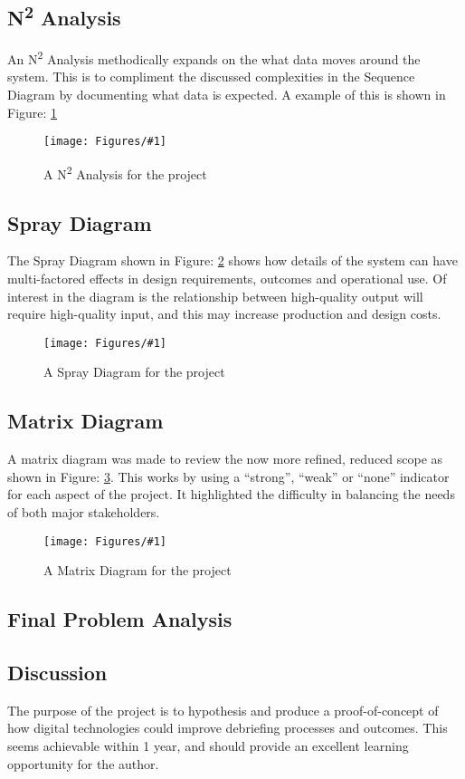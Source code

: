 \documentclass{UoNMCHA}
\newcommand{\fref}[1] {Figure: \ref{#1}}
\newcommand{\fFigure}[3]{
	\begin{figure}[h]
        \begin{center}  
            \texttt{[image: Figures/\#1]}  
            \caption{#2}
            \label{#1}
        \end{center}
	\end{figure}
}
\numberwithin{equation}{section}
\begin{document}
\subsection{N\textsuperscript{2} Analysis}
An N\textsuperscript{2} Analysis methodically expands on the what data moves around the system. This is to compliment the discussed complexities in the Sequence Diagram by documenting what data is expected. A example of this is shown in \fref{n2analysis.png}
\fFigure{n2analysis.png}{A N\textsuperscript{2} Analysis for the project}{0.8}

\subsection{Spray Diagram}
The Spray Diagram shown in \fref{SprayDiagram.png} shows how details of the system can have multi-factored effects in design requirements, outcomes and operational use. Of interest in the diagram is the relationship between high-quality output will require high-quality input, and this may increase production and design costs. 
\fFigure{SprayDiagram.png}{A Spray Diagram for the project}{0.8}

\subsection{Matrix Diagram}
A matrix diagram was made to review the now more refined, reduced scope as shown in \fref{MatrixDiagram.png}. This works by using a “strong”, “weak” or “none” indicator for each aspect of the project. It highlighted the difficulty in balancing the needs of both major stakeholders. 
\fFigure{MatrixDiagram.png}{A Matrix Diagram for the project}{0.8}

\subsection{Final Problem Analysis}
\subsection{Discussion}
The purpose of the project is to hypothesis and produce a proof-of-concept of how digital technologies could improve debriefing processes and outcomes. This seems achievable within 1 year, and should provide an excellent learning opportunity for the author.

\end{document}
